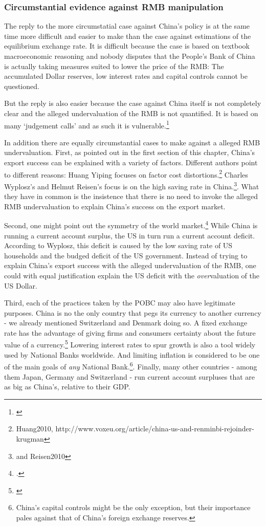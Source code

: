 \subsubsection{Circumstantial evidence against RMB manipulation}

The reply to the more circumstatial case against China's policy is at the same time more difficult and easier to make than the case against estimations of the equilibrium exchange rate. It is difficult because the case is based on textbook macroeconomic reasoning and nobody disputes that the People's Bank of China is actually taking measures suited to lower the price of the RMB: The accumulated Dollar reserves, low interest rates and capital controls cannot be questioned.

But the reply is also easier because the case against China itself is not completely clear and the alleged undervaluation of the RMB is not quantified. It is based on many  `judgement calls' and as such it is vulnerable.\footnote{\cite[p. 85]{CheungChinnFujii2010}}

In addition there are equally circumstantial cases to make against a alleged RMB undervaluation. First, as pointed out in the first section of this chapter, China's export success can be explained with a variety of factors.  Different authors point to different reasons: Huang Yiping focuses on factor cost distortions.\footnote{Huang2010, http://www.voxeu.org/article/china-us-and-renminbi-rejoinder-krugman} Charles Wyplosz's and Helmut Reisen's focus is on the high saving rate in China.\footnote{\cite[pp. 40]{Wyplosz2010} and \cite{p. 65}{Reisen2010}}. What they have in common is the insistence that there is no need to invoke the alleged RMB undervaluation to explain China's success on the export market.

Second, one might point out the symmetry of the world market.\footnote{\cite[pp. 39-40]{Wyplosz2010}.} While China is running a current account surplus, the US in turn run a current account deficit. According to Wyplosz, this deficit is caused by the low saving rate of US households and the budged deficit of the US government. Instead of trying to explain China's export success with the alleged undervaluation of the RMB, one could with equal justification explain the US deficit with the \emph{over}valuation of the US Dollar. 

Third, each of the practices taken by the POBC may also have legitimate purposes. China is no the only country that pegs its currency to another currency - we already mentioned Switzerland and Denmark doing so. A fixed exchange rate has the advantage of giving firms and consumers certainty about the future value of a currency.\footnote{\cite[p. 515]{Krugman2008}} Lowering interest rates to spur growth is also a tool widely used by National Banks worldwide. And limiting inflation is considered to be one of the main goals of \emph{any} National Bank.\footnote{China's capital controls might be the only exception, but their importance pales against that of China's foreign exchange reserves.}. Finally, many other countries - among them Japan, Germany and Switzerland - run current account surpluses that are as big as China's, relative to their GDP.

